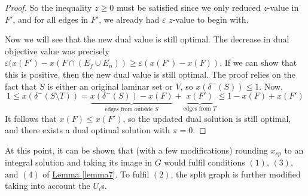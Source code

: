 \documentclass[./main.tex]{subfiles}
\begin{document}
\begin{proof}
			So the inequality $z\geqslant 0$ must be satisfied since we only reduced $z$-value in $F'$, and for all edges in $F'$, we already had $\varepsilon$ $z$-value to begin with.\\\vspace{2mm}
			
			Now we will see that the new dual value is still optimal. 
			The decrease in dual objective value was precisely $\varepsilon (x(F') - x(F\cap( E_f\cup E_n))\geqslant \varepsilon(x(F') - x(F))$. 
			If we can show that this is positive, then the new dual value is still optimal. The proof relies on the fact that $S$ is either an original laminar set or $V$, so $x(\delta^-(S))\leqslant 1$. 
			Now, 
			\[
				1\leqslant x(\delta^-(S\setminus T)) = \underbrace{x(\delta^-(S)) - x(F)}_{\text{edges from outside } S} + \underbrace{x(F')}_{\text{edges from } T}\leqslant 1 - x(F) + x(F')
			\]
			It follows that $x(F)\leqslant x(F')$, so the updated dual solution is still optimal, and there exists a dual optimal solution with $\pi = 0$.
		\end{proof}
		
		At this point, it can be shown that (with a few modifications) rounding $x_{sp}$ to an integral solution and taking its image in $G$ would fulfil conditions $(1)$, $(3)$, and $(4)$ of \hyperref[lemma7]{Lemma \ref{lemma7}}. To fulfil $(2)$, the split graph is further modified taking into account the $U_i$s.\\
		\vspace{2mm}
		
\end{document}
